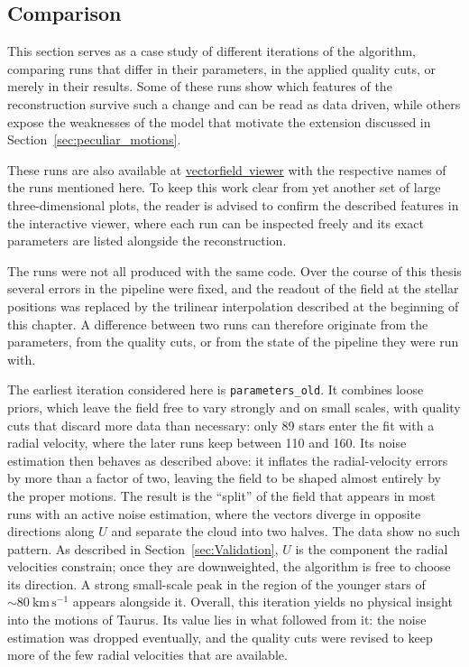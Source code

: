 \subsection{Comparison}
\label{sec:Comparison}
This section serves as a case study of different iterations of the algorithm, comparing runs that differ in
their parameters, in the applied quality cuts, or merely in their results. Some of these runs show which
features of the reconstruction survive such a change and can be read as data driven, while others expose
the weaknesses of the model that motivate the extension discussed in Section~\ref{sec:peculiar_motions}.

These runs are also available at \href{https://dereppi.github.io/Viewer/}{vectorfield~viewer} with the respective
names of the runs mentioned here. To keep this work clear from yet another set of large three-dimensional plots,
the reader is advised to confirm the described features in the interactive viewer, where each run can be inspected
freely and its exact parameters are listed alongside the reconstruction.

The runs were not all produced with the same code. Over the course of this thesis several errors in the
pipeline were fixed, and the readout of the field at the stellar positions was replaced by the trilinear
interpolation described at the beginning of this chapter. A difference between two runs can therefore
originate from the parameters, from the quality cuts, or from the state of the pipeline they were run with.

The earliest iteration considered here is \texttt{parameters\_old}. It combines loose priors, which leave
the field free to vary strongly and on small scales, with quality cuts that discard more data than
necessary: only 89 stars enter the fit with a radial velocity, where the later runs keep between 110 and
160. Its noise estimation then behaves as described above: it inflates the radial-velocity errors by more
than a factor of two, leaving the field to be shaped almost entirely by the proper motions. The result is
the ``split'' of the field that appears in most runs with an active noise estimation, where the vectors
diverge in opposite directions along $U$ and separate the cloud into two halves. The data show no such
pattern. As described in Section~\ref{sec:Validation}, $U$ is the component the radial velocities
constrain; once they are downweighted, the algorithm is free to choose its direction. A strong small-scale peak in the region of the younger stars of $\sim80~\mathrm{km\,s^{-1}}$ appears alongside it. Overall,
this iteration yields no physical insight into the motions of Taurus. Its value lies in what followed from
it: the noise estimation was dropped eventually, and the quality cuts were revised to keep more of the few radial
velocities that are available.

